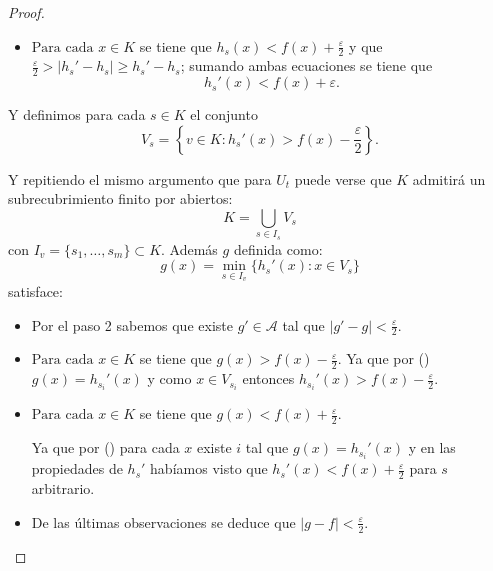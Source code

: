 \begin{proof}
\begin{itemize}
        \item $\text{Para cada } x \in K$ se tiene que $h_s(x) < f(x) + \frac{\varepsilon}{2}$ y que $\frac{\varepsilon}{2} > |h_s' - h_s| \geq h_s' - h_s$; sumando ambas ecuaciones se tiene que 
        \begin{equation}
            h_s'(x) < f(x) + \varepsilon.
        \end{equation}
        
    \end{itemize} 
     

    Y definimos para cada $s \in K$ el conjunto 
    \begin{equation}\label{subrecubrimiento_s}
        V_s = \left\{
            v \in K  \colon
            h_s'(x) > f(x) - \frac{\varepsilon}{2}
            \right\}.
    \end{equation} 

    Y repitiendo el mismo argumento que para $U_t$ puede verse que $K$ admitirá un 
    subrecubrimiento finito por abiertos: 
    \begin{equation*}
        K = \bigcup_{s \in I_s} V_s
    \end{equation*}
    con $I_v = \{s_1, \ldots, s_m\} \subset K$. 
    Además $g$ definida como: 
    \begin{equation}
        g(x)= \min_{s \in I_v}
        \{ 
            h_{s}'(x) 
            \colon
            x \in V_s
        \} 
    \end{equation}
    satisface:  
    \begin{itemize}

        \item Por el paso 2 sabemos que existe $g' \in \mathcal{A}$ tal que   $|g' - g| < \frac{\varepsilon}{2}$.
         
        \item $\text{Para cada } x \in K$ se tiene que $g(x) >f(x) - \frac{\varepsilon}{2}$.
        Ya que por 
        ()   
        $g(x) =  h_{s_i}'(x)$ y 
        como $x \in V_{s_i}$ entonces 
        $h_{s_i}'(x) > f(x) - \frac{\varepsilon}{2}$.
        \item $\text{Para cada } x \in K$ se tiene que $g(x) <f(x) + \frac{\varepsilon}{2}$.
        
        Ya que por 
        () para cada $x$ existe $i$ tal que 
        $g(x) =  h_{s_i}'(x)$ y 
        en las propiedades de $h_s'$ habíamos visto que
        $h_{s}'(x) < f(x) + \frac{\varepsilon}{2}$ para $s$ arbitrario.
        \item De las últimas observaciones se deduce que $|g-f| < \frac{\varepsilon}{2}$.


\end{itemize}
\end{proof}
